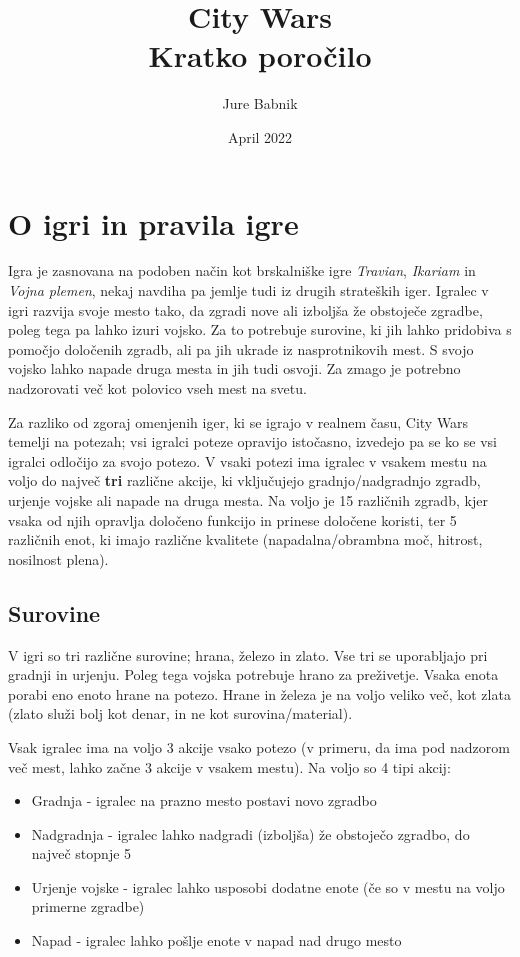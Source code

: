 \documentclass[a4paper, 16pt]{article}
\title{City Wars \\ Kratko poročilo}
\date{April 2022}
\author{Jure Babnik}
\begin{document}
\maketitle

\section{O igri in pravila igre}

Igra je zasnovana na podoben način kot brskalniške igre \textit{Travian}, \textit{Ikariam} in \textit{Vojna plemen}, nekaj navdiha pa jemlje tudi iz drugih strateških iger.
Igralec v igri razvija svoje mesto tako, da zgradi nove ali izboljša že obstoječe zgradbe, poleg tega pa lahko izuri vojsko. Za to potrebuje surovine, ki jih lahko pridobiva s pomočjo določenih zgradb, 
ali pa jih ukrade iz nasprotnikovih mest. S svojo vojsko lahko napade druga mesta in jih tudi osvoji. Za zmago je potrebno nadzorovati več kot polovico vseh mest na svetu.

Za razliko od zgoraj omenjenih iger, ki se igrajo v realnem času, City Wars temelji na potezah; vsi igralci poteze opravijo istočasno, izvedejo pa se ko se vsi igralci odločijo za svojo potezo. 
V vsaki potezi ima igralec v vsakem mestu na voljo 
do največ \textbf{tri} različne akcije, ki vključujejo gradnjo/nadgradnjo zgradb, urjenje vojske ali napade na druga mesta. Na voljo je 15 različnih zgradb, kjer vsaka od njih 
opravlja določeno funkcijo in prinese določene koristi, ter 5 različnih enot, ki imajo različne kvalitete (napadalna/obrambna moč, hitrost, nosilnost plena).

\subsection{Surovine}

V igri so tri različne surovine; hrana, železo in zlato. Vse tri se uporabljajo pri gradnji in urjenju. Poleg tega vojska potrebuje hrano za preživetje. Vsaka enota porabi eno enoto hrane na potezo.
Hrane in železa je na voljo veliko več, kot zlata (zlato služi bolj kot denar, in ne kot surovina/material).


Vsak igralec ima na voljo 3 akcije vsako potezo (v primeru, da ima pod nadzorom več mest, lahko začne 3 akcije v vsakem mestu). Na voljo so 4 tipi akcij:

\begin{itemize}
    \item Gradnja - igralec na prazno mesto postavi novo zgradbo
    \item Nadgradnja - igralec lahko nadgradi (izboljša) že obstoječo zgradbo, do največ stopnje 5
    \item Urjenje vojske - igralec lahko usposobi dodatne enote (če so v mestu na voljo primerne zgradbe)
    \item Napad - igralec lahko pošlje enote v napad nad drugo mesto
\end{itemize}
\end{document}
